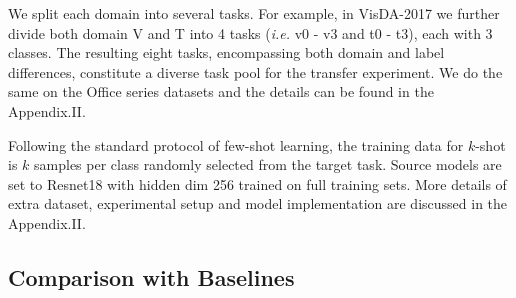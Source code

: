 \documentclass[letterpaper]{article} %
\begin{document}
We split each domain into several tasks. For example, in VisDA-2017 we further divide both domain V and T into 4 tasks (\textit{i.e.} v0 - v3 and t0 - t3), each with 3 classes. The resulting eight tasks, encompassing both domain and label differences, constitute a diverse task pool for the transfer experiment.
We do the same on the Office series datasets and the details can be found in the Appendix.II.






Following the standard protocol of few-shot learning, the training data for $k$-shot is $k$ samples per class randomly selected from the target task. Source models are set to Resnet18 with hidden dim 256 trained on full training sets. More details of extra dataset, experimental setup and model implementation are discussed in the Appendix.II.



\subsection{Comparison with Baselines}
\end{document}
